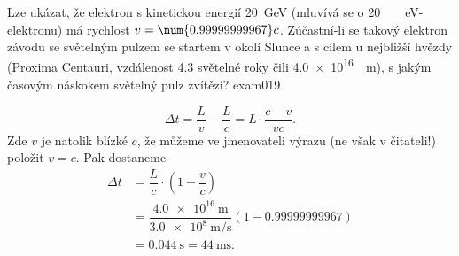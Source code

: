 \begin{fyzexam}{Lze ukázat, že elektron s kinetickou energií \SI{20}{\giga\electronvolt} (mluvívá se
  o \protect\SI{20}{\protect\giga\protect\electronvolt}-elektronu) má rychlost \(v = \num{0.999 999
  999 67}c\). Zúčastní-li se takový elektron závodu se světelným pulzem se startem v okolí Slunce a
  s cílem u nejbližší hvězdy (Proxima Centauri, vzdálenost \num{4.3} světelné roky čili
  \protect\SI{4.0e16}{\protect\meter}), s jakým časovým náskokem světelný pulz zvítězí?
  \hfill\cite[s.~1008]{Halliday2001}}{exam019} 

  \begin{equation*}
    \Delta t = \dfrac{L}{v} - \dfrac{L}{c} = L\cdot\dfrac{c-v}{vc}.
  \end{equation*} 
  Zde \(v\) je natolik blízké \(c\), že můžeme ve jmenovateli výrazu (ne však v čitateli!) položit
  \(v = c\). Pak dostaneme
  \begin{align*}
    \Delta t &=\dfrac{L}{c}\cdot\left(1-\dfrac{v}{c}\right)                                      \\
             &=\dfrac{\SI{4.0e16}{\meter}}{\SI{3.0e8}{\meter\per\s}}(1-\num{0.999 999 999 67}) \\
             &=\SI{0.044}{\s} = \SI{44}{\milli\s}.
  \end{align*} 
\end{fyzexam}